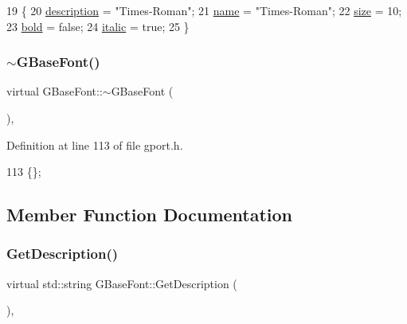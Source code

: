 \begin{DoxyCode}
19 \{
20     \mbox{\hyperlink{class_g_base_font_a81dc0a7c8b42df0a39e49cc304da7d06}{description}} = \textcolor{stringliteral}{"Times-Roman"};
21     \mbox{\hyperlink{class_g_base_font_a09217b162b03d74c2ea2e65bec537c5b}{name}} = \textcolor{stringliteral}{"Times-Roman"};
22     \mbox{\hyperlink{class_g_base_font_a3665d1d315cccd1d1487eed589a8da0f}{size}} = 10;
23     \mbox{\hyperlink{class_g_base_font_a710baf8db958e41f964cb8af600df4c7}{bold}} = \textcolor{keyword}{false};
24     \mbox{\hyperlink{class_g_base_font_aeff487abd13b9a9110b18a89ad51975e}{italic}} = \textcolor{keyword}{true};
25 \}
\end{DoxyCode}
\mbox{\label{class_g_base_font_a3517ce7aeadbbe9d77cab6e4a5aebe61}} 
\subsubsection{\texorpdfstring{$\sim$\+G\+Base\+Font()}{~GBaseFont()}}
{\footnotesize\ttfamily virtual G\+Base\+Font\+::$\sim$\+G\+Base\+Font (\begin{DoxyParamCaption}{ }\end{DoxyParamCaption})\hspace{0.3cm}{\ttfamily [inline]}, {\ttfamily [virtual]}}



Definition at line 113 of file gport.\+h.


\begin{DoxyCode}
113 \{\};
\end{DoxyCode}


\subsection{Member Function Documentation}
\mbox{\label{class_g_base_font_a223b6eee3ba7e714d5dbb763ee4e3f9a}} 
\subsubsection{\texorpdfstring{Get\+Description()}{GetDescription()}}
{\footnotesize\ttfamily virtual std\+::string G\+Base\+Font\+::\+Get\+Description (\begin{DoxyParamCaption}{ }\end{DoxyParamCaption})\hspace{0.3cm}{\ttfamily [inline]}, {\ttfamily [virtual]}}



